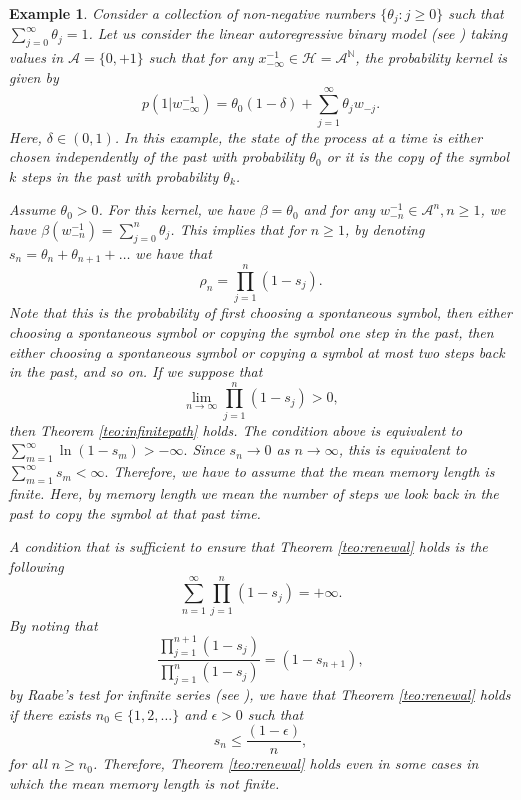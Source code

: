 \documentclass[a4paper]{article}
\newtheorem{example}[theorem]{Example}
\newcommand{\N}{\mathbb{N}}
\renewcommand{\H}{\mathcal{H}}
\newcommand{\A}{\mathcal{A}}
\begin{document}
\begin{example} \label{ex:autoregressive}
Consider a collection of non-negative numbers $\{\theta_j:j\geq 0\}$  such that $\sum_{j=0}^{\infty}\theta_j=1$. Let us consider the linear autoregressive binary model (see \cite{autoregressive}) taking values in $\A=\{0,+1\}$ such that for any $x_{-\infty}^{-1}\in \H=\A^{\N}$, the probability kernel is  given by
$$
p(1|w_{-\infty}^{-1})= \theta_0(1-\delta) +\sum_{j=1}^{\infty}\theta_jw_{-j}.
$$
Here, $\delta \in (0,1)$. In this example, the state of the process at a time is either chosen independently of the past with probability $\theta_0$ or it is the copy of the symbol $k$ steps in the past with probability $\theta_k$. 


Assume $\theta_0>0$. For this kernel, we have $\beta=\theta_0$ and for any $w_{-n}^{-1} \in \A^n, n\geq 1$, we have $\beta(w_{-n}^{-1})=\sum_{j=0}^{n}\theta_j$. This implies that for $n\geq 1$, by denoting $s_n=\theta_{n}+\theta_{n+1}+\ldots$ we have that
$$
\rho_n= \prod_{j=1}^{n}(1-s_j).
$$
Note that this is the probability of first choosing a spontaneous symbol, then either choosing a spontaneous symbol or copying the symbol one step in the past, then  either choosing a spontaneous symbol or copying a symbol at most two steps back in the past, and so on.  
If we suppose that
\begin{equation}\label{eq:autoregressive}
    \lim_{n\to \infty} \prod_{j=1}^{n}(1-s_j)>0,
\end{equation}
then Theorem \ref{teo:infinitepath} holds.
The condition above is equivalent to
$
\sum_{m=1}^{\infty} \ln (1-s_m)> -\infty.
$
Since $s_n\to 0$ as $n\to \infty$, this is equivalent to
$
\sum_{m=1}^{\infty}s_m< \infty.
$
Therefore, we have to assume that the mean memory length  is finite. Here, by {\it memory length} we mean the number of steps we look back in the past to copy the symbol at that past time.  

A condition that is sufficient to ensure that Theorem \ref{teo:renewal} holds is the following
$$
\sum_{n=1}^{\infty}\prod_{j=1}^{n}(1-s_j)=+\infty.
$$
By noting that
$$
\frac{\prod_{j=1}^{n+1}(1-s_j)}{\prod_{j=1}^{n}(1-s_j)}=(1-s_{n+1}),
$$
by Raabe's test for infinite series (see \cite{infiniteseries}), we have that Theorem \ref{teo:renewal} holds if there exists $n_0\in \{1,2,\ldots\}$ and $\epsilon >0$ such that
$$
s_n\leq \frac{(1-\epsilon)}{n},
$$
for all $n\geq n_0$. Therefore, Theorem \ref{teo:renewal} holds even in some cases in which the mean memory length is not finite.
\end{example}
\end{document}
